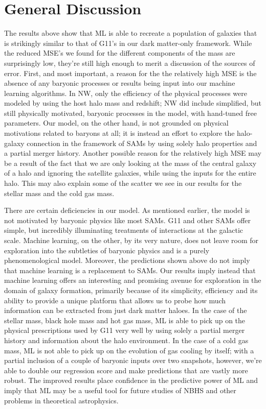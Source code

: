 \documentclass[a4paper,fleqn,usenatbib]{mnras}
\begin{document}
\section{General Discussion} \label{discussion}
\par
The results above show that ML is able to recreate a population of galaxies that is strikingly similar to that of G11's in our dark matter-only framework. While the reduced MSE's we found for the different components of the mass are surprisingly low, they're still high enough to merit a discussion of the sources of error. First, and most important, a reason for the the relatively high MSE is the absence of any baryonic processes or results being input into our machine learning algorithms. In NW, only the efficiency of the physical processes were modeled by using the host halo mass and redshift; NW did include simplified, but still physically motivated, baryonic processes in the model, with hand-tuned free parameters. Our model, on the other hand, is not grounded on physical motivations related to baryons at all; it is instead an effort to explore the halo-galaxy connection in the framework of SAMs by using solely halo properties and a partial merger history. Another possible reason for the relatively high MSE may be a result of the fact that we are only looking at the mass of the central galaxy of a halo and ignoring the satellite galaxies, while using the inputs for the entire halo. This may also explain some of the scatter we see in our results for the stellar mass and the cold gas mass. 

\par 
There are certain deficiencies in our model. As mentioned earlier, the model is not motivated by baryonic physics like most SAMs. G11 and other SAMs offer simple, but incredibly illuminating treatments of interactions at the galactic scale. Machine learning, on the other, by its very nature, does not leave room for exploration into the subtleties of baryonic physics and is a purely phenomenological model. Moreover, the predictions shown above do not imply that machine learning is a replacement to SAMs. Our results imply instead that machine learning offers an interesting and promising avenue for exploration in the domain of galaxy formation, primarily because of its simplicity, efficiency and its ability to provide a unique platform that allows us to probe how much information can be extracted from just dark matter haloes. In the case of the stellar mass, black hole mass and hot gas mass, ML is able to pick up on the physical prescriptions used by G11 very well by using solely a partial merger history and information about the halo environment. In the case of a cold gas mass, ML is not able to pick up on the evolution of gas cooling by itself; with a partial inclusion of a couple of baryonic inputs over two snapshots, however, we're able to double our regression score and make predictions that are vastly more robust. The improved results place confidence in the predictive power of ML and imply that ML may be a useful tool for future studies of NBHS and other problems in theoretical astrophysics. 
\end{document}
